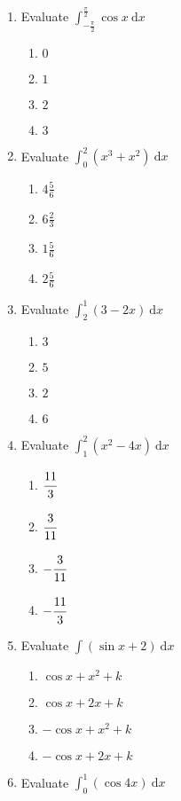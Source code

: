 \begin{multicols}{2}
\begin{enumerate}[label={\arabic*.}]
\item Evaluate \(\displaystyle \int_{-{\frac{\pi}{2}}}^{\frac{\pi}{2}} \cos{x}\ \mathrm{d}x\)
	\begin{enumerate}[label={\Alph*.}]
	\item \(0\)
	\item \(1\)
	\item \(2\)
	\item \(3\)
	\end{enumerate}
\item Evaluate \(\displaystyle \int_{0}^{2} \left({x}^{3}+{x}^{2}\right)\ \mathrm{d}x\)
	\begin{enumerate}[label={\Alph*.}]
	\item \(4\frac{5}{6}\)
	\item \(6\frac{2}{3}\)
	\item \(1\frac{5}{6}\)
	\item \(2\frac{5}{6}\)
	\end{enumerate}
\item Evaluate \(\displaystyle \int_{2}^{1} \left(3-2x\right)\ \mathrm{d}x\)
	\begin{enumerate}[label={\Alph*.}]
	\item \(3\)
	\item \(5\)
	\item \(2\)
	\item \(6\)
	\end{enumerate}
\item Evaluate \(\displaystyle \int_{1}^{2} \left({x}^{2}-4x\right)\ \mathrm{d}x\)
	\begin{enumerate}[label={\Alph*.}]
	\item \(\cfrac{11}{3}\)
	\item \(\cfrac{3}{11}\)
	\item \(-{\cfrac{3}{11}}\)
	\item \(-{\cfrac{11}{3}}\)
	\end{enumerate}
\item Evaluate \(\displaystyle \int \left(\sin{x}+2\right)\ \mathrm{d}x\)
	\begin{enumerate}[label={\Alph*.}]
	\item \(\cos{x} + {x}^{2} + k\)
	\item \(\cos{x} + 2x + k\)
	\item \(-{\cos{x}} + {x}^{2} + k\)
	\item \(-{\cos{x}} + 2x + k\)
	\end{enumerate}
\item Evaluate \(\displaystyle \int_{0}^{1} \left(\cos{4x}\right)\ \mathrm{d}x\)

\end{enumerate}
\end{multicols}
